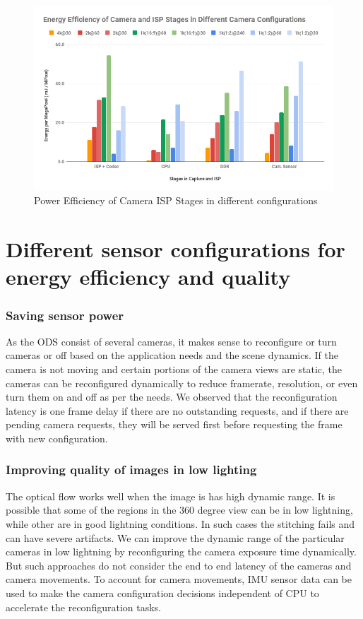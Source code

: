 \begin{figure}
	\begin{center}
		\includegraphics[width=1\textwidth]{data/images/Power_Efficiency_of_Camera_ISP_Stages_in_different_configurations.png}
		\caption{Power Efficiency of Camera ISP Stages in different configurations}
		\label{fig:ex_4_9}
	\end{center}
	\vspace{-0.3in}
\end{figure} 



\section{Different sensor configurations for energy efficiency and quality}
\subsubsection{Saving sensor power}
As the ODS consist of several cameras, it makes sense to reconfigure or turn cameras or off based on the application needs and the scene dynamics. If the camera is not moving and certain portions of the camera views are static, the cameras can be reconfigured dynamically to reduce framerate, resolution, or even turn them on and off as per the needs. We observed that the reconfiguration latency is one frame delay if there are no outstanding requests, and if there are pending camera requests, they will be served first before requesting the frame with new configuration. 
\subsubsection{Improving quality of images in low lighting}
The optical flow works well when the image is has high dynamic range. It is possible that some of the regions in the 360 degree view can be in low lightning, while other are in good lightning conditions. In such cases the stitching fails and can have severe artifacts. We can improve the dynamic range of the particular cameras in low lightning by reconfiguring the camera exposure time dynamically. But such approaches do not consider the end to end latency of the cameras and camera movements. To account for camera movements, IMU sensor data can be used to make the camera configuration decisions independent of CPU to accelerate the reconfiguration tasks. 

